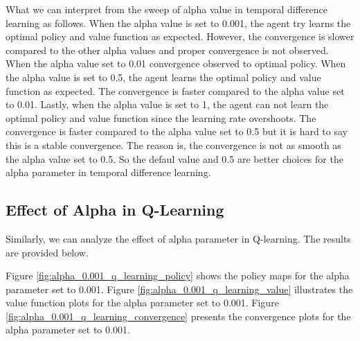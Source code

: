 \documentclass{assignment}
\begin{document}
What we can interpret from the sweep of alpha value in temporal difference learning as follows. When the alpha value is set to 0.001, the agent try learns the optimal policy and value function as expected. However, the convergence is slower compared to the other alpha values and proper convergence is not observed. When the alpha value set to 0.01 convergence observed to optimal policy. When the alpha value is set to 0.5, the agent learns the optimal policy and value function as expected. The convergence is faster compared to the alpha value set to 0.01. Lastly, when the alpha value is set to 1, the agent can not learn the optimal policy and value function since the learning rate overshoots. The convergence is faster compared to the alpha value set to 0.5 but it is hard to say this is a stable convergence. The reason is, the convergence is not as smooth as the alpha value set to 0.5. So the defaul value and 0.5 are better choices for the alpha parameter in temporal difference learning.


\subsection{Effect of Alpha in Q-Learning}
Similarly, we can analyze the effect of alpha parameter in Q-learning. The results are provided below.

Figure \ref{fig:alpha_0.001_q_learning_policy} shows the policy maps for the alpha parameter set to 0.001. Figure \ref{fig:alpha_0.001_q_learning_value} illustrates the value function plots for the alpha parameter set to 0.001. Figure \ref{fig:alpha_0.001_q_learning_convergence} presents the convergence plots for the alpha parameter set to 0.001.
\end{document}
